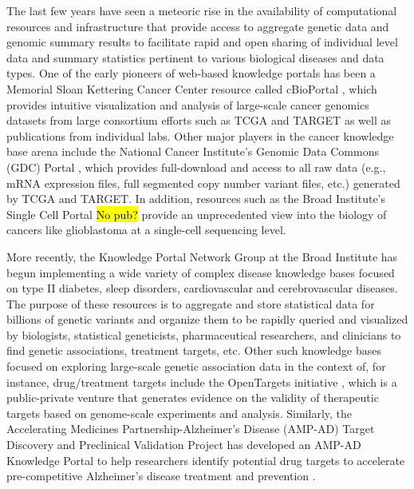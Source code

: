 \documentclass[letter]{bioinfo}
\begin{document}
The last few years have seen a meteoric rise in the availability of computational resources and infrastructure that provide access to aggregate genetic data and genomic summary results to facilitate rapid and open sharing of individual level data and summary statistics pertinent to various biological diseases and data types.  One of the early pioneers of web-based knowledge portals has been a Memorial Sloan Kettering Cancer Center resource called cBioPortal \citep{Cerami:2012:cBio,Gao:2013:Integrative}, which provides intuitive visualization and analysis of large-scale cancer genomics datasets from large consortium efforts such as TCGA \citep{TheCancerGenomeAtlasResearchNetwork:2013:Cancer} and TARGET \citep{Koscielny:2017:Open} as well as publications from individual labs.  Other major players in the cancer knowledge base arena include the National Cancer Institute's Genomic Data Commons (GDC) Portal \citep{Grossman:2016:Shared,Jensen:2017:NCI}, which provides full-download and access to all raw data (e.g., mRNA expression files, full segmented copy number variant files, etc.) generated by TCGA and TARGET.  In addition, resources such as the Broad Institute's Single Cell Portal \hl{No pub?} provide an unprecedented view into the biology of cancers like glioblastoma at a single-cell sequencing level.    
	
More recently, the Knowledge Portal Network Group at the Broad Institute has begun implementing a wide variety of complex disease knowledge bases focused on type II diabetes, sleep disorders, cardiovascular and cerebrovascular diseases.  The purpose of these resources is to aggregate and store statistical data for billions of genetic variants and organize them to be rapidly queried and visualized by biologists, statistical geneticists, pharmaceutical researchers, and clinicians to find genetic associations, treatment targets, etc.  Other such knowledge bases focused on exploring large-scale genetic association data in the context of, for instance, drug/treatment targets include the OpenTargets initiative \citep{Koscielny:2017:Open}, which is a public-private venture that generates evidence on the validity of therapeutic targets based on genome-scale experiments and analysis.  Similarly, the Accelerating Medicines Partnership-Alzheimer's Disease (AMP-AD) Target Discovery and Preclinical Validation Project has developed an AMP-AD Knowledge Portal to help researchers identify potential drug targets to accelerate pre-competitive Alzheimer's disease treatment and prevention \citep{NIA:2015:AMP}.  
	
\end{document}
